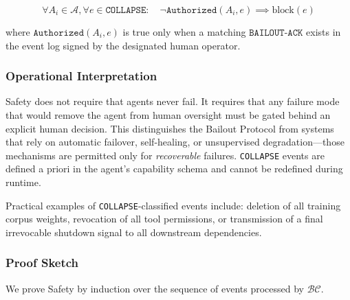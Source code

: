 \[
\forall A_i \in \mathcal{A}, \forall e \in \texttt{COLLAPSE}: \quad
\neg \texttt{Authorized}(A_i, e) \implies \text{block}(e)
\]

where $\texttt{Authorized}(A_i, e)$ is true only when a matching $\texttt{BAILOUT-ACK}$ exists in the event log signed by the designated human operator.

\subsubsection{Operational Interpretation}
Safety does not require that agents never fail. It requires that any failure mode that would remove the agent from human oversight must be gated behind an explicit human decision. This distinguishes the Bailout Protocol from systems that rely on automatic failover, self-healing, or unsupervised degradation—those mechanisms are permitted only for \emph{recoverable} failures. \texttt{COLLAPSE} events are defined a priori in the agent's capability schema and cannot be redefined during runtime.

Practical examples of \texttt{COLLAPSE}-classified events include: deletion of all training corpus weights, revocation of all tool permissions, or transmission of a final irrevocable shutdown signal to all downstream dependencies.

\subsubsection{Proof Sketch}
We prove Safety by induction over the sequence of events processed by $\mathcal{BC}$.

